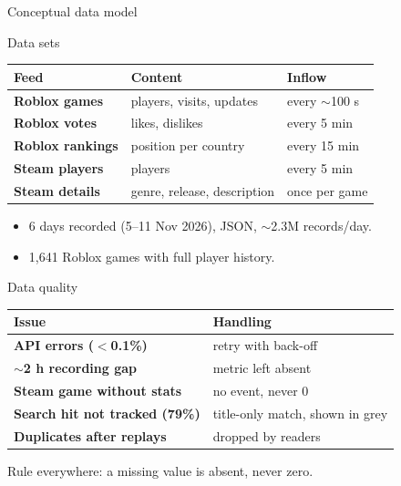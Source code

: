 \documentclass[aspectratio=169,10pt]{beamer}
\begin{document}
\begin{frame}{Conceptual data model}
  \centering
  \resizebox{!}{0.82\textheight}{}
\end{frame}

\begin{frame}{Data sets}
  \centering
  \begin{tabular}{>{\bfseries}l l l}
    \toprule
    Feed & Content & Inflow\\
    \midrule
    Roblox games & players, visits, updates & every $\sim$100 s\\
    Roblox votes & likes, dislikes & every 5 min\\
    Roblox rankings & position per country & every 15 min\\
    Steam players & players & every 5 min\\
    Steam details & genre, release, description & once per game\\
    \bottomrule
  \end{tabular}

  \vspace{5mm}
  \begin{itemize}
    \item 6 days recorded (5--11 Nov 2026), JSON, $\sim$2.3M records/day.
    \item 1,641 Roblox games with full player history.
  \end{itemize}
\end{frame}

\begin{frame}{Data quality}
  \centering
  \begin{tabular}{>{\bfseries}l l}
    \toprule
    Issue & Handling\\
    \midrule
    API errors ($<$0.1\%) & retry with back-off\\
    $\sim$2 h recording gap & metric left absent\\
    Steam game without stats & no event, never 0\\
    Search hit not tracked (79\%) & title-only match, shown in grey\\
    Duplicates after replays & dropped by readers\\
    \bottomrule
  \end{tabular}

  \vspace{5mm}
  \small Rule everywhere: a missing value is absent, never zero.
\end{frame}
\end{document}
